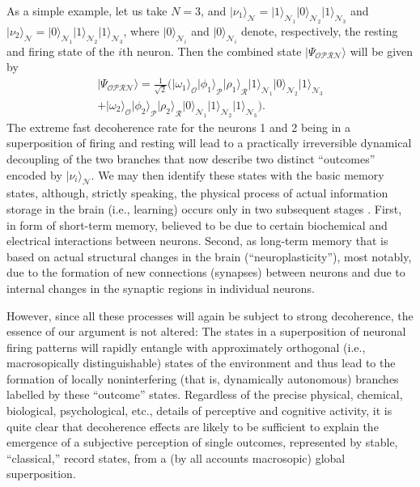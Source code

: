 \documentclass[12pt,aps,floatfix,amsmath,amssymb,showpacs,nofootinbib]{revtex4-2}
\newcommand{\ket}[1]{\ensuremath{|{#1\rangle}}}
\begin{document}
As a simple example, let us take $N=3$, and $\ket{\nu_1}_\mathcal{N} =
\ket{1}_{\mathcal{N}_1} \ket{0}_{\mathcal{N}_2}
\ket{1}_{\mathcal{N}_3}$ and $\ket{\nu_2}_\mathcal{N} =
\ket{0}_{\mathcal{N}_1} \ket{1}_{\mathcal{N}_2}
\ket{1}_{\mathcal{N}_3}$, where $\ket{0}_{\mathcal{N}_i}$ and
$\ket{0}_{\mathcal{N}_i}$ denote, respectively, the resting and firing
state of the $i$th neuron. Then the combined state
$\ket{\Psi_\mathcal{OPRN}}$ will be given by
%
\begin{multline}
\ket{\Psi_\mathcal{OPRN}} = \frac{1}{\sqrt{2}} \bigl(
\ket{\omega_1}_\mathcal{O} \ket{\phi_1}_\mathcal{P}
\ket{\rho_1}_\mathcal{R} \ket{1}_{\mathcal{N}_1} \ket{0}_{\mathcal{N}_2}
\ket{1}_{\mathcal{N}_3} 
\\ + \ket{\omega_2}_\mathcal{O} \ket{\phi_2}_\mathcal{P}
\ket{\rho_2}_\mathcal{R}  \ket{0}_{\mathcal{N}_1} \ket{1}_{\mathcal{N}_2}
\ket{1}_{\mathcal{N}_3} \bigr).
\end{multline}
%
The extreme fast decoherence rate for the neurons 1 and 2 being in a
superposition of firing and resting will lead to a practically
irreversible dynamical decoupling of the two branches that now
describe two distinct ``outcomes'' encoded by
$\ket{\nu_i}_\mathcal{N}$. We may then identify these states with the
basic memory states, although, strictly speaking, the physical process
of actual information storage in the brain (i.e., learning) occurs
only in two subsequent stages \cite{Kandel:2000:tr}. First, in form of
short-term memory, believed to be due to certain biochemical and
electrical interactions between neurons. Second, as long-term memory
that is based on actual structural changes in the brain
(``neuroplasticity''), most notably, due to the formation of new
connections (synapses) between neurons and due to internal changes in
the synaptic regions in individual neurons.

However, since all these processes will again be subject to strong
decoherence, the essence of our argument is not altered: The states in
a superposition of neuronal firing patterns will rapidly entangle with
approximately orthogonal (i.e., macrosopically distinguishable) states
of the environment and thus lead to the formation of locally
noninterfering (that is, dynamically autonomous) branches labelled by
these ``outcome'' states. Regardless of the precise physical,
chemical, biological, psychological, etc., details of perceptive and
cognitive activity, it is quite clear that decoherence effects are
likely to be sufficient to explain the emergence of a subjective
perception of single outcomes, represented by stable, ``classical,''
record states, from a (by all accounts macrosopic) global
superposition.
\end{document}
